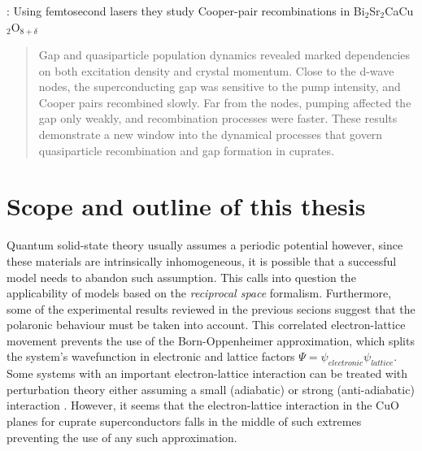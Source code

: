 \cite{Smallwood2012}: Using femtosecond lasers they study Cooper-pair recombinations in Bi$_2$Sr$_2$CaCu$_2$O$_{8+\delta}$
\begin{quote}Gap and quasiparticle population dynamics revealed marked dependencies on both excitation density and crystal momentum. Close to the d-wave nodes, the superconducting gap was sensitive to the pump intensity, and Cooper pairs recombined slowly. Far from the nodes, pumping affected the gap only weakly, and recombination processes were faster. These results demonstrate a new window into the dynamical processes that govern quasiparticle recombination and gap formation in cuprates.\end{quote}

\section{Scope and outline of this thesis}
\label{sec:scope}



Quantum solid-state theory usually assumes a periodic potential however, since these materials are intrinsically inhomogeneous, it is possible that a successful model needs to abandon such assumption. 
This calls into question the applicability of models based on the \textit{reciprocal space} formalism.
Furthermore, some of the experimental results reviewed in the previous secions suggest that the polaronic behaviour must be taken into account.
This correlated electron-lattice movement prevents the use of the Born-Oppenheimer approximation, which splits the system's wavefunction in electronic and lattice factors $\Psi = \psi_{electronic}\psi_{lattice}$.
Some systems with an important electron-lattice interaction can be treated with perturbation theory either assuming a small (adiabatic) or strong (anti-adiabatic) interaction \cite{?}. 
However, it seems that the electron-lattice interaction in the CuO planes for cuprate superconductors falls in the middle of such extremes \cite{MustredeLeon1992} preventing the use of any such approximation.

